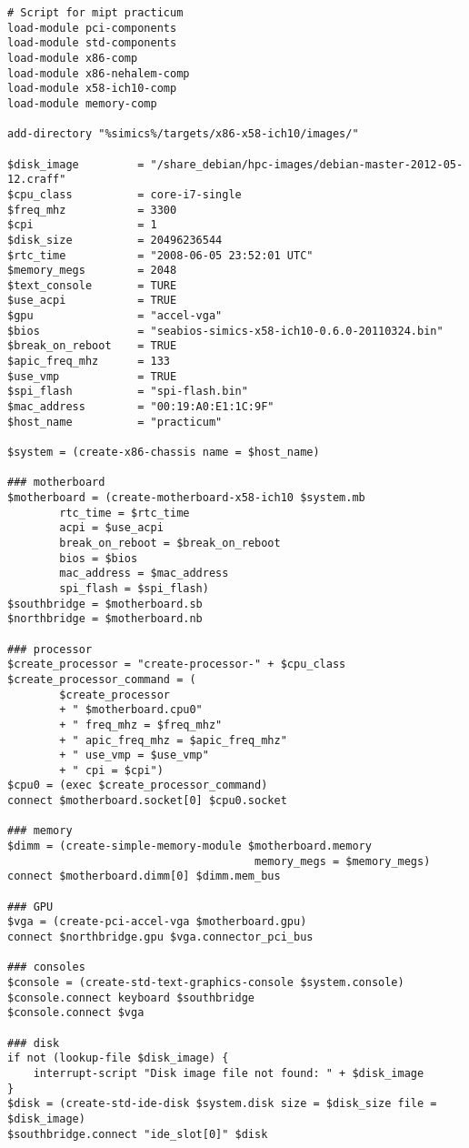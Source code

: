 \begin{lstlisting}
# Script for mipt practicum
load-module pci-components
load-module std-components
load-module x86-comp
load-module x86-nehalem-comp
load-module x58-ich10-comp
load-module memory-comp

add-directory "%simics%/targets/x86-x58-ich10/images/"

$disk_image         = "/share_debian/hpc-images/debian-master-2012-05-12.craff"
$cpu_class          = core-i7-single
$freq_mhz           = 3300
$cpi                = 1
$disk_size          = 20496236544
$rtc_time           = "2008-06-05 23:52:01 UTC"
$memory_megs        = 2048
$text_console       = TURE
$use_acpi           = TRUE
$gpu                = "accel-vga"
$bios               = "seabios-simics-x58-ich10-0.6.0-20110324.bin"
$break_on_reboot    = TRUE
$apic_freq_mhz      = 133
$use_vmp            = TRUE
$spi_flash          = "spi-flash.bin"
$mac_address        = "00:19:A0:E1:1C:9F"
$host_name          = "practicum"

$system = (create-x86-chassis name = $host_name)

### motherboard
$motherboard = (create-motherboard-x58-ich10 $system.mb
        rtc_time = $rtc_time
        acpi = $use_acpi
        break_on_reboot = $break_on_reboot
        bios = $bios
	    mac_address = $mac_address
        spi_flash = $spi_flash)
$southbridge = $motherboard.sb
$northbridge = $motherboard.nb

### processor
$create_processor = "create-processor-" + $cpu_class
$create_processor_command = (
        $create_processor
        + " $motherboard.cpu0"
        + " freq_mhz = $freq_mhz"
        + " apic_freq_mhz = $apic_freq_mhz"
        + " use_vmp = $use_vmp"
        + " cpi = $cpi")
$cpu0 = (exec $create_processor_command)
connect $motherboard.socket[0] $cpu0.socket

### memory
$dimm = (create-simple-memory-module $motherboard.memory
                                      memory_megs = $memory_megs)
connect $motherboard.dimm[0] $dimm.mem_bus

### GPU
$vga = (create-pci-accel-vga $motherboard.gpu)
connect $northbridge.gpu $vga.connector_pci_bus

### consoles
$console = (create-std-text-graphics-console $system.console)
$console.connect keyboard $southbridge
$console.connect $vga

### disk
if not (lookup-file $disk_image) {
    interrupt-script "Disk image file not found: " + $disk_image
}
$disk = (create-std-ide-disk $system.disk size = $disk_size file = $disk_image)
$southbridge.connect "ide_slot[0]" $disk


\end{lstlisting}
